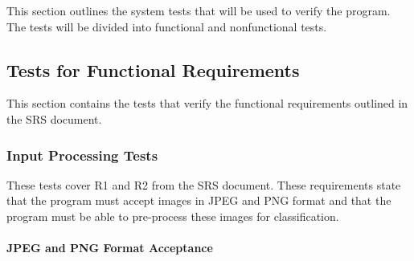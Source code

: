 \documentclass[12pt, titlepage]{article}
\begin{document}
This section outlines the system tests that will be used to verify the \progname{}
program. The tests will be divided into functional and nonfunctional tests.

\subsection{Tests for Functional Requirements}

This section contains the tests that verify the functional requirements outlined
in the SRS document.

\subsubsection{Input Processing Tests}

These tests cover R1 and R2 from the SRS document. These requirements state that
the program must accept images in JPEG and PNG format and that the program must
be able to pre-process these images for classification.

\paragraph{JPEG and PNG Format Acceptance}
\end{document}
